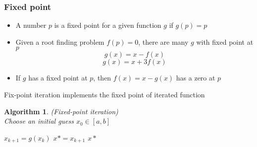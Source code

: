 \documentclass[12pt]{article}
\newtheorem{alg}[theorem]{Algorithm}
\begin{document}
\subsubsection{Fixed point} \begin{itemize}
	\item A number $p$ is a fixed point for a given function $g$ if $g(p) = p$
	\item Given a root finding problem $f(p) = 0$, there are many $g$ with fixed point at $p$
	$$g(x) = x - f(x)$$ $$g(x) = x + 3f(x)$$
	\item If $g$ has a fixed point at $p$, then $f(x) = x -g(x)$ has a zero at $p$
\end{itemize}
Fix-point iteration implements the fixed point of iterated function \\ 
\begin{alg}(Fixed-point iteration) \\
Choose an initial guess $x_0 \in [a,b]$
\begin{algorithmic}
\State $x_{k+1} = g(x_k)$
\State $x* = x_{k+1}$
\State \Return $x*$
\EndIf
\EndFor
\end{algorithmic}

\end{alg}
\end{document}
